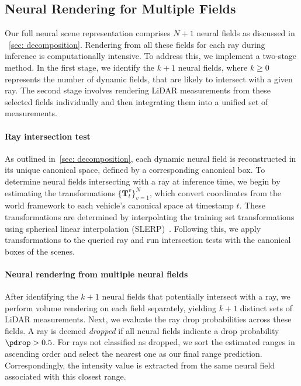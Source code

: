 \subsection{Neural Rendering for Multiple Fields}\label{sec:neural_fields_composition}
Our full neural scene representation comprises $N+1$ neural fields as discussed in ~\cref{sec: decomposition}. Rendering from all these fields for each ray during inference is computationally intensive. To address this, we implement a two-stage method. In the first stage, we identify the $k+1$ neural fields, where $k \geq 0$ represents the number of dynamic fields, that are likely to intersect with a given ray. The second stage involves rendering LiDAR measurements from these selected fields individually and then integrating them into a unified set of measurements.


\paragraph{Ray intersection test}
As outlined in~\cref{sec: decomposition}, each dynamic neural field is reconstructed in its unique canonical space, defined by a corresponding canonical box. To determine neural fields intersecting with a ray at inference time, we begin by estimating the transformations $\{\mathbf{T}_t^v\}_{v=1}^N$, which convert coordinates from the world framework to each vehicle's canonical space at timestamp $t$. These transformations are determined by interpolating the training set transformations using spherical linear interpolation (SLERP)~\cite{10.1145/325334.325242}. Following this, we apply transformations to the queried ray and run intersection tests with the canonical boxes of the scenes. 


\paragraph{Neural rendering from multiple neural fields}
 After identifying the $k+1$ neural fields that potentially intersect with a ray, we perform volume rendering on each field separately, yielding $k+1$ distinct sets of LiDAR measurements. Next, we evaluate the ray drop probabilities across these fields. A ray is deemed \textit{dropped} if all neural fields indicate a drop probability $\pdrop > 0.5$. For rays not classified as dropped, we sort the estimated ranges in ascending order and select the nearest one as our final range prediction. Correspondingly, the intensity value is extracted from the same neural field associated with this closest range.
